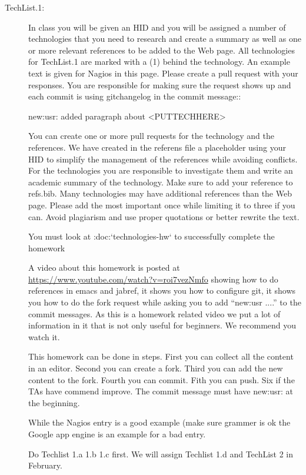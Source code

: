 \begin{description}

\item[TechList.1:] In class you will be given an HID and you will be assigned
  a number of technologies that you need to research and create a
  summary as well as one or more relevant references to be added to the
  Web page. All technologies for TechList.1 are marked with a (1)
  behind the technology.  An example text is given for Nagios in this
  page.  Please create a pull request with your responses. You are
  responsible for making sure the request shows up and each commit is
  using gitchangelog in the commit message::

    new:usr: added paragraph about <PUTTECHHERE>

  You can create one or more pull requests for the technology and the
  references. We have created in the referens file a placeholder using
  your HID to simplify the management of the references while avoiding
  conflicts.  For the technologies you are responsible to investigate
  them and write an academic summary of the technology. Make sure to
  add your reference to refs.bib.  Many technologies may have
  additional references than the Web page. Please add the most
  important once while limiting it to three if you can. Avoid
  plagiarism and use proper quotations or better rewrite the text.

  You must look at :doc:`technologies-hw` to successfully complete the
  homework

  A video about this homework is posted at
  \url{https://www.youtube.com/watch?v=roi7vezNmfo} showing how to
  do references in emacs and jabref, it shows you how to configure
  git, it shows you how to do the fork request while asking you to add
  ``new:usr ....'' to the commit messages. As this is a homework
  related video we put a lot of information in it that is not only
  useful for beginners. We recommend you watch it.


  This homework can be done in steps. First you can collect all the
  content in an editor. Second you can create a fork. Third you can
  add the new content to the fork. Fourth you can commit. Fith you
  can push. Six if the TAs have commend improve. The commit message
  must have new:usr: at the beginning.

  While the Nagios entry is a good example (make sure grammer is ok
  the Google app engine is an example for a bad entry.

  Do Techlist 1.a 1.b 1.c first. We  will assign Techlist 1.d and
  TechList 2 in February.


\end{description}
